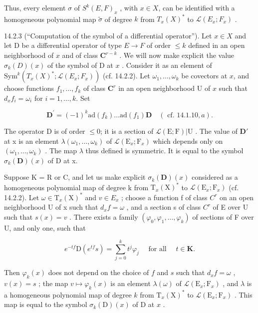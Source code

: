 Thus, every element \(\sigma\) of \(S^{k}(E,F)_{x}\) , with \(x\in X\), can be identified with a homogeneous polynomial map \(\tilde{\sigma}\) of degree \(k\) from \(T_{x}(X)^{*}\) to \(\mathcal{L}(E_{x};F_{x})\) .

14.2.3 (“Computation of the symbol of a differential operator”). Let \(x \in X\) and let D be a differential operator of type \(E \to F\) of order \(\leqslant k\) defined in an open neighborhood of \(x\) and of class \(\mathbf{C}^{r-k}\) . We will now make explicit the value \(\sigma_k(D)(x)\) of the symbol of D at \(x\) . Consider it as an element of \(\text{Sym}^k(T_x(X)^*; \mathcal{L}(E_x; F_x))\) (cf. 14.2.2). Let \(\omega_1, \ldots, \omega_k\) be covectors at \(x\), and choose functions \(f_1, \ldots, f_k\) of class \(\mathbf{C}^r\) in an open neighborhood U of \(x\) such that \(d_x f_i = \omega_i\) for \(i = 1, \ldots, k\). Set

\[
\mathbf {D} ^ {\prime} = (- 1) ^ {k} \mathrm{ad} (f _ {k}) \dots \mathrm{ad} (f _ {1}) \mathbf {D} \quad (\text { cf. } 14.1.10, a).
\]

The operator D is of order \(\leqslant0\); it is a section of \(\mathcal{L}(\mathrm{E};\mathrm{F})|\mathrm{U}\) . The value of \(\mathbf{D}'\) at x is an element \(\lambda(\omega_{1},\ldots,\omega_{k})\) of \(\mathcal{L}(\mathrm{E}_{x};\mathrm{F}_{x})\) which depends only on \((\omega_{1},\ldots,\omega_{k})\) . The map \(\lambda\) thus defined is symmetric. It is equal to the symbol \(\sigma_{k}(\mathbf{D})(x)\) of D at x.

Suppose K = R or C, and let us make explicit \(\sigma_{k}(\mathbf{D})(x)\) considered as a homogeneous polynomial map of degree k from \(\mathrm{T}_{x}(\mathrm{X})^{*}\) to \(\mathcal{L}(\mathrm{E}_{x};\mathrm{F}_{x})\) (cf. 14.2.2). Let \(\omega \in \mathrm{T}_{x}(\mathrm{X})^{*}\) and \(v \in E_{x}\) ; choose a function f of class \(C^{r}\) on an open neighborhood U of x such that \(d_{x}f = \omega\) , and a section s of class \(C^{r}\) of E over U such that \(s(x) = v\) . There exists a family \((\varphi_{0}, \varphi_{1}, \ldots, \varphi_{k})\) of sections of F over U, and only one, such that

\[
e ^ {- t f} \mathrm{D} (e ^ {t f} s) = \sum_ {j = 0} ^ {k} t ^ {j} \varphi_ {j} \quad \text { for all } \quad t \in \mathbf {K}.
\]

Then \(\varphi_{k}(x)\) does not depend on the choice of \(f\) and \(s\) such that \(d_{x}f = \omega\) , \(v(x) = s\) ; the map \(v \mapsto \varphi_{k}(x)\) is an element \(\lambda(\omega)\) of \(\mathcal{L}(\mathrm{E}_{x}; \mathrm{F}_{x})\) , and \(\lambda\) is a homogeneous polynomial map of degree \(k\) from \(\mathrm{T}_{x}(\mathrm{X})^{*}\) to \(\mathcal{L}(\mathrm{E}_{x}; \mathrm{F}_{x})\) . This map is equal to the symbol \(\sigma_{k}(\mathrm{D})(x)\) of D at \(x\) .

